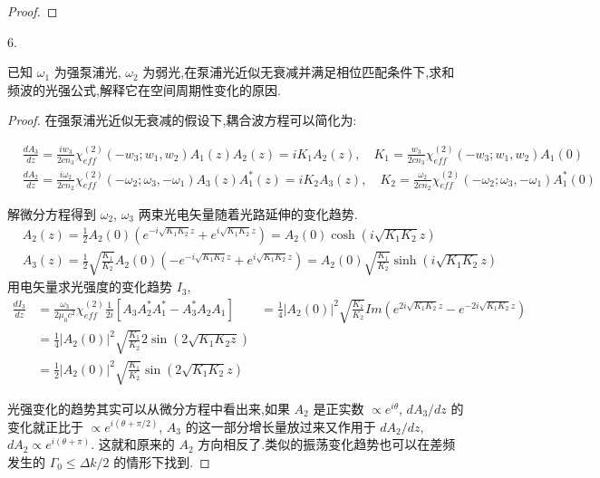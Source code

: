 \begin{proof}

\end{proof}

\begin{exercise}

6. 

已知 $\omega_1$ 为强泵浦光, $\omega_2$ 为弱光,在泵浦光近似无衰减并满足相位匹配条件下,求和频波的光强公式,解释它在空间周期性变化的原因.
\end{exercise}

\begin{proof}

在强泵浦光近似无衰减的假设下,耦合波方程可以简化为:

$$
\begin{aligned}
&\frac{d A_{3}}{d z}=\frac{i w_{3}}{2 c n_{3}} \chi_{eff}^{(2)}\left(-w_{3} ; w_{1}, w_{2}\right) A_{1}(z) A_{2}(z)=i K_{1} A_{2}(z),\quad 
K_1=\frac{ w_{3}}{2 c n_{3}} \chi_{eff}^{(2)}\left(-w_{3} ; w_{1}, w_{2}\right) A_{1}(0)\\
&\frac{d A_2}{d z}=\frac{i \omega_{2}}{2 c n_{2}} \chi_{eff}^{(2)}\left(-\omega_{2} ; \omega_{3},-\omega_{1}\right) A_{3}(z) A_{1}^{*}(z)=i K_{2} A_{3}(z),\quad
K_2=\frac{ \omega_{2}}{2 c n_{2}} \chi_{eff}^{(2)}\left(-\omega_{2} ; \omega_{3},-\omega_{1}\right)  A_{1}^{*}(0)
\end{aligned}
$$

解微分方程得到 $\omega_2$, $\omega_3$ 两束光电矢量随着光路延伸的变化趋势.
$$
\begin{aligned}
&A_{2}(z)=\frac{1}{2} A_{2}(0)\left(e^{-i \sqrt{K_{1} K_{2}} z}+e^{i \sqrt{K_1 K_2}  z}\right)=A_{2}(0) \cosh (i \sqrt{K_1 K_{2} }z)\\
&A_{3}(z)=\frac{1}{2} \sqrt{\frac{K_{1}}{K_{2}}} A_{2}(0)  \left(-e^{-i \sqrt{K_{1} K_{2} }z}+e^{i \sqrt{K_{1} K_{2} }z}\right)=A_{2}(0) \sqrt{\frac{K_{1}}{K_{2}}} \sinh (i \sqrt{K_{1} K_{2} }z)
\end{aligned}
$$
用电矢量求光强度的变化趋势 $I_3$,
$$
\begin{aligned}
\frac{d I_{3}}{d z}&=\frac{\omega_{3}}{2 \mu_{0} c^{2}} \chi_{e ff}^{(2)} \frac{1}{2 i}\left[A_{3} A_{2}^{*} A_{1}^{*}-A_{3}^{*} A_{2} A_{1}\right]
&=\frac{1}{4}\left|A_{2} (0)\right|^{2} \sqrt{\frac{K_1}{K_{2}}}Im \left(e^{2 i \sqrt{K_{1} K_{2}} z}-e^{-2 i \sqrt{K_{1} K_{2}} z}\right)\\
&=\frac{1}{4}\left|A_{2}(0)\right|^{2} \sqrt{\frac{K_{1}}{K_{2}}} 2 \sin (2 \sqrt{K_{1} K_{2} z})\\
&=\frac{1}{2}\left|A_{2}(0)\right|^{2} \sqrt{\frac{K_{1}}{K_{2}}} \sin (2 \sqrt{K_1 K_{2}} z)
\end{aligned}
$$

光强变化的趋势其实可以从微分方程中看出来,如果 $A_2$ 是正实数 $\propto e^{i\theta}$, 
$dA_3/dz$ 的变化就正比于 $\propto e^{i(\theta+\pi/2)}$, $A_3$ 的这一部分增长量放过来又作用于 $dA_2/dz$, $dA_2 \propto e^{i(\theta + \pi)}$. 
这就和原来的 $A_2$ 方向相反了.类似的振荡变化趋势也可以在差频发生的 $\Gamma_0 \leq \Delta k/2$ 的情形下找到.
\end{proof}

